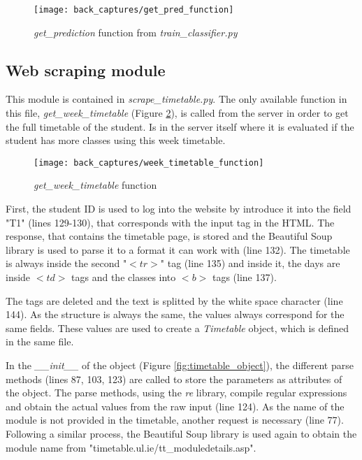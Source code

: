 	\begin{figure}[!ht]
		\centering
		\texttt{[image: back\_captures/get\_pred\_function]}
		\caption{\textit{get{\_}prediction} function from \textit{train{\_}classifier.py}}
		\label{fig:get_pred_function}
	\end{figure}

	\subsection{Web scraping module}
	\label{subsec:scraping_module}
	This module is contained in \textit{scrape{\_}timetable.py}. The only available function in this file, \textit{get{\_}week{\_}timetable} (Figure \ref{fig:get_timetable_function}), is called from the server in order to get the full timetable of the student. Is in the server itself where it is evaluated if the student has more classes using this week timetable.

	\begin{figure}[!ht]
		\centering
		\texttt{[image: back\_captures/week\_timetable\_function]}
		\caption{\textit{get{\_}week{\_}timetable} function}
		\label{fig:get_timetable_function}
	\end{figure}

	First, the student ID is used to log into the website by introduce it into the field "T1" (lines 129-130), that corresponds with the input tag in the HTML. The response, that contains the timetable page, is stored and the Beautiful Soup library is used to parse it to a format it can work with (line 132). The timetable is always inside the second "$<tr>$" tag (line 135) and inside it, the days are inside $<td>$ tags and the classes into $<b>$ tags (line 137). 

	The tags are deleted and the text is splitted by the white space character (line 144). As the structure is always the same, the values always correspond for the same fields. These values are used to create a \textit{Timetable} object, which is defined in the same file. 

	In the \textit{{\_}{\_}init{\_}{\_}} of the object (Figure \ref{fig:timetable_object}), the different parse methods (lines 87, 103, 123) are called to store the parameters as attributes of the object. The parse methods, using the \textit{re} library, compile regular expressions and obtain the actual values from the raw input (line 124). As the name of the module is not provided in the timetable, another request is necessary (line 77). Following a similar process, the Beautiful Soup library is used again to obtain the module name from "timetable.ul.ie/tt{\_}moduledetails.asp".

